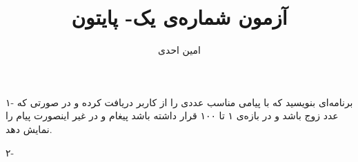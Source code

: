 \documentclass{article}
\title{آزمون شماره‌ی یک- پایتون}
\author{امین احدی}
\date{}
\begin{document}
	\maketitle

	
	۱- برنامه‌ای بنویسید که با پیامی مناسب عددی را از کاربر دریافت کرده و در صورتی که عدد زوج باشد و در بازه‌ی ۱ تا ۱۰۰ قرار داشته باشد
	پیغام  و در غیر اینصورت پیام  را نمایش دهد.
	
	۲- 
	
	
	
	
	
	
	
	
	
	
\end{document}
